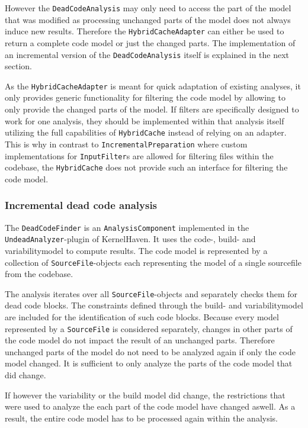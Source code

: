 \documentclass[a4paper]{article}
\begin{document}
However the \texttt{Dead\-Code\-Analysis} may only need to access the part of the model that was modified as processing unchanged parts of the model does not always induce new results. Therefore the \texttt{Hybrid\-Cache\-Adapter} can either be used to return a complete code model or just the changed parts. The implementation of an incremental version of the \texttt{Dead\-Code\-Analysis} itself is explained in the next section.

As the \texttt{Hybrid\-Cache\-Adapter} is meant for quick adaptation of existing analyses, it only provides generic functionality for filtering the code model by allowing to only provide the changed parts of the model. If filters are specifically designed to work for one analysis, they should be implemented within that analysis itself utilizing the full capabilities of \texttt{Hybrid\-Cache} instead of relying on an adapter. This is why in contrast to \texttt{Incremental\-Preparation} where custom implementations for \texttt{InputFilter}s are allowed for filtering files within the codebase, the \texttt{Hybrid\-Cache} does not provide such an interface for filtering the code model.

\subsubsection{Incremental dead code analysis} \label{incremental-dead-code-analysis}

The \texttt{Dead\-Code\-Finder} is an \texttt{Analysis\-Component} implemented in the \texttt{UndeadAnalyzer}-plugin of KernelHaven. It uses the code-, build- and variabilitymodel to compute results. The code model is represented by a collection of \texttt{Source\-File}-objects each representing the model of a single sourcefile from the codebase.

The analysis iterates over all \texttt{Source\-File}-objects and separately checks them for dead code blocks. The constraints defined through the build- and variabilitymodel are included for the identification of such code blocks. Because every model represented by a \texttt{Source\-File} is considered separately, changes in other parts of the code model do not impact the result of an unchanged parts. Therefore unchanged parts of the model do not need to be analyzed again if only the code model changed. It is sufficient to only analyze the parts of the code model that did change.

If however the variability or the build model did change, the restrictions that were used to analyze the each part of the code model have changed aswell. As a result, the entire code model has to be processed again within the analysis.
\end{document}

